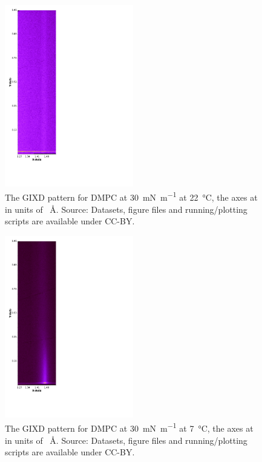 \documentclass[11pt,a4paper]{article}
\begin{document}
\begin{figure}[h]
	\centering
	\includegraphics[width=0.50\textwidth]{figures/206151}
	\caption{The GIXD pattern for DMPC at \SI{30}{\milli\newton\per\meter} at \SI{22}{\celsius}, the axes at in units of \si{\per\angstrom}. Source: Datasets, figure files and running/plotting scripts are available under CC-BY.\cite{mccluskey_2018}}
	\label{fig:dmpcgixd}
\end{figure}
\begin{figure}[h]
	\centering
	\includegraphics[width=0.50\textwidth]{figures/206161}
	\caption{The GIXD pattern for DMPC at \SI{30}{\milli\newton\per\meter} at \SI{7}{\celsius}, the axes at in units of \si{\per\angstrom}. Source: Datasets, figure files and running/plotting scripts are available under CC-BY.\cite{mccluskey_2018}}
	\label{fig:dmpcgixd7}
\end{figure}
\end{document}
